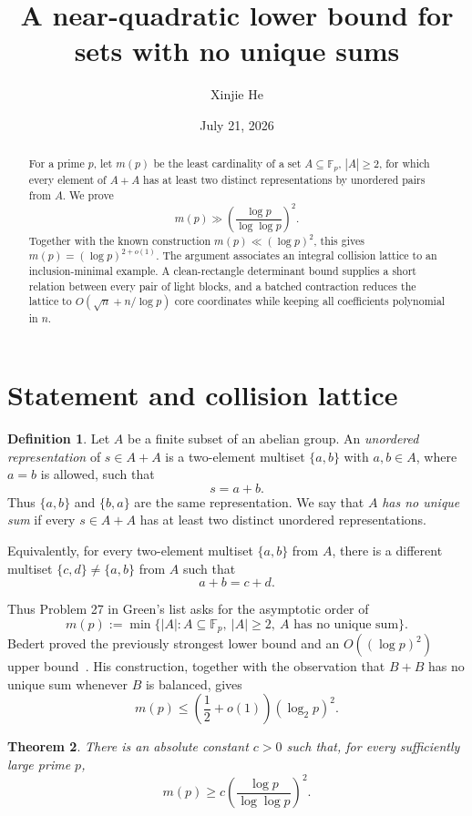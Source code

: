 \documentclass[10pt]{article}
\title{A near-quadratic lower bound for sets with no unique sums}
\author{Xinjie He}
\date{July 21, 2026}
\newtheorem{theorem}{Theorem}[section]
\theoremstyle{definition}
\newtheorem{definition}[theorem]{Definition}
\begin{document}
\maketitle

\begin{abstract}
For a prime $p$, let $m(p)$ be the least cardinality of a set
$A\subseteq\mathbb F_p$, $|A|\ge2$, for which every element of $A+A$ has at
least two distinct representations by unordered pairs from $A$.  We prove
\[
    m(p)\gg
    \left(\frac{\log p}{\log\log p}\right)^2.
\]
Together with the known construction $m(p)\ll(\log p)^2$, this gives
$m(p)=(\log p)^{2+o(1)}$.  The argument associates an integral collision
lattice to an inclusion-minimal example.  A clean-rectangle determinant
bound supplies a short relation between every pair of light blocks, and a
batched contraction reduces the lattice to
$O(\sqrt n+n/\log p)$ core coordinates while keeping all coefficients
polynomial in $n$.
\end{abstract}

\section{Statement and collision lattice}

\begin{definition}
Let $A$ be a finite subset of an abelian group.  An \emph{unordered
representation} of $s\in A+A$ is a two-element multiset $\{a,b\}$ with
$a,b\in A$, where $a=b$ is allowed, such that
\[
    s=a+b.
\]
Thus $\{a,b\}$ and $\{b,a\}$ are the same representation.  We say that
$A$ \emph{has no unique sum} if every $s\in A+A$ has at least two distinct
unordered representations.

Equivalently, for every two-element multiset $\{a,b\}$ from $A$, there is a
different multiset $\{c,d\}\ne\{a,b\}$ from $A$ such that
\[
    a+b=c+d.
\]
\end{definition}

Thus Problem 27 in Green's list asks for the asymptotic order of
\[
    m(p):=\min\bigl\{|A|:A\subseteq\mathbb F_p,\ |A|\ge2,\
                         A\text{ has no unique sum}\bigr\}.
\]
Bedert proved the previously strongest lower bound and an
$O((\log p)^2)$ upper bound~\cite{bedert}.  His construction, together with
the observation that $B+B$ has no unique sum whenever $B$ is balanced,
gives
\[
    m(p)\le\left(\frac12+o(1)\right)(\log_2p)^2.
\]

\begin{theorem}
There is an absolute constant $c>0$ such that, for every sufficiently large
prime $p$,
\[
    m(p)\ge
    c\left(\frac{\log p}{\log\log p}\right)^2.
\]
\end{theorem}
\end{document}
